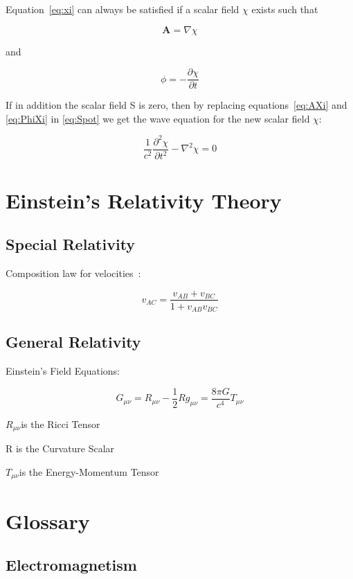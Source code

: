 \documentclass[english]{book}
\begin{document}
Equation~\ref{eq:xi} can always be satisfied if a scalar field $\chi$ exists such that

\begin{equation}
\mathbf{A} = \nabla \chi      \label{eq:AXi}
\end{equation}

and

\begin{equation}
\phi = - \frac{\partial \chi}{\partial t}        \label{eq:PhiXi}
\end{equation}

If in addition the scalar field S is zero, then by replacing equations~\ref{eq:AXi} and \ref{eq:PhiXi} in \ref{eq:Spot} we get the wave equation for the new scalar field $\chi$:

\begin{equation}
\frac{1}{c^{2}}\frac{\partial^{2}\chi}{\partial t^{2}} - \nabla^{2}\chi = 0
\end{equation}


\chapter{Einstein's Relativity Theory}

\section{Special Relativity}

Composition law for velocities~\cite{dinverno}:

\[
v_{AC} = \frac{v_{AB} + v_{BC}}{1+v_{AB}v_{BC}}
\]


\section{General Relativity}

Einstein's Field Equations:

\[
G_{\mu\nu}=R_{\mu\nu}-\frac{1}{2}Rg_{\mu\nu}=\frac{8\pi G}{c^{4}}T_{\mu\nu}
\]

$R_{\mu\nu}$is the Ricci Tensor

R is the Curvature Scalar

$T_{\mu\nu}$is the Energy-Momentum Tensor


\chapter{Glossary}

\section{Electromagnetism}
\end{document}
